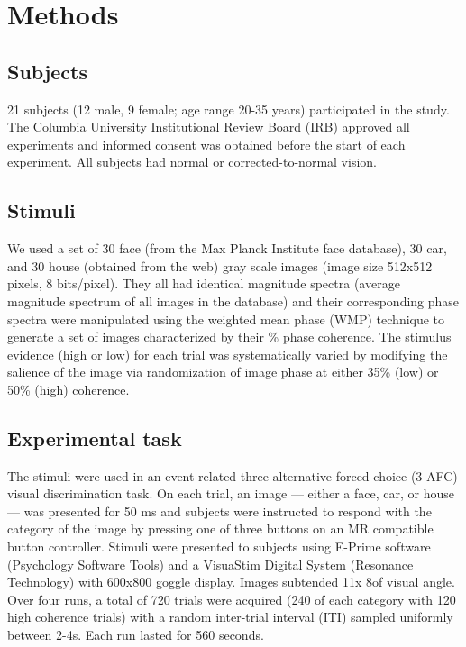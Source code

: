 \section*{Methods}
\subsection*{Subjects}

21 subjects (12 male, 9 female; age range 20-35 years) participated in the study. The Columbia University Institutional Review Board (IRB) approved all experiments and informed consent was obtained before the start of each experiment. All subjects had normal or corrected-to-normal vision.

\subsection*{Stimuli}
We used a set of 30 face (from the Max Planck Institute face database), 30 car, and 30 house (obtained from the web) gray scale images (image size 512x512 pixels, 8 bits/pixel). They all had identical magnitude spectra (average magnitude spectrum of all images in the database) and their corresponding phase spectra were manipulated using the weighted mean phase (WMP) \cite{Dakin2002} technique to generate a set of images characterized by their \% phase coherence. The stimulus evidence (high or low) for each trial was systematically varied by modifying the salience of the image via randomization of image phase at either 35\% (low) or  50\% (high) coherence.

\subsection*{Experimental task}
The stimuli were used in an event-related three-alternative forced choice (3-AFC) visual discrimination task. On each trial, an image — either a face, car, or house — was presented for 50 ms and subjects were instructed to respond with the category of the image by pressing one of three buttons on an MR compatible button controller. Stimuli were presented to subjects using E-Prime software (Psychology Software Tools) and a VisuaStim Digital System (Resonance Technology) with 600x800 goggle display. Images  subtended 11\textdegree x 8\textdegree of visual angle. Over four runs, a total of 720 trials were acquired (240 of each category with 120 high coherence trials) with a random inter-trial interval (ITI) sampled uniformly between 2-4s. Each run lasted for 560 seconds. 

